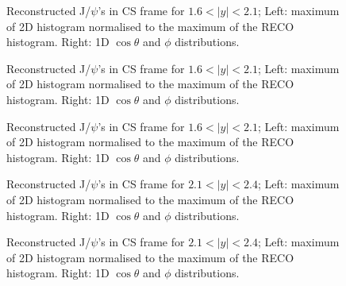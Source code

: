 \documentclass[12pt]{article}
\newcommand{\jpsi}{J/$\psi$}
\begin{document}
\begin{figure}[htbp]
\centering
{}
\caption{Reconstructed \jpsi's in CS frame for $1.6 < |y| < 2.1$; Left: maximum of 2D histogram normalised to the maximum of the RECO histogram. Right: 1D $\cos\theta$ and $\phi$ distributions.}
\label{fig:trackerMuonsVsEta}
\end{figure} \clearpage 

\begin{figure}[htbp]
\centering
{}
\caption{Reconstructed \jpsi's in CS frame for $1.6 < |y| < 2.1$; Left: maximum of 2D histogram normalised to the maximum of the RECO histogram. Right: 1D $\cos\theta$ and $\phi$ distributions.}
\label{fig:trackerMuonsVsEta}
\end{figure} \clearpage 

\begin{figure}[htbp]
\centering
{}
\caption{Reconstructed \jpsi's in CS frame for $1.6 < |y| < 2.1$; Left: maximum of 2D histogram normalised to the maximum of the RECO histogram. Right: 1D $\cos\theta$ and $\phi$ distributions.}
\label{fig:trackerMuonsVsEta}
\end{figure} \clearpage 


\begin{figure}[htbp]
\centering
{}
\caption{Reconstructed \jpsi's in CS frame for $2.1 < |y| < 2.4$; Left: maximum of 2D histogram normalised to the maximum of the RECO histogram. Right: 1D $\cos\theta$ and $\phi$ distributions.}
\label{fig:trackerMuonsVsEta}
\end{figure} \clearpage 

\begin{figure}[htbp]
\centering
{}
\caption{Reconstructed \jpsi's in CS frame for $2.1 < |y| < 2.4$; Left: maximum of 2D histogram normalised to the maximum of the RECO histogram. Right: 1D $\cos\theta$ and $\phi$ distributions.}
\label{fig:trackerMuonsVsEta}
\end{figure} \clearpage 
\end{document}
